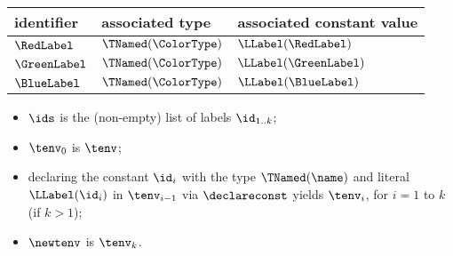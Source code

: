 \begin{center}
\begin{tabular}{lll}
\textbf{identifier} & \textbf{associated type} & \textbf{associated constant value}\\
\hline
$\RedLabel$ & $\TNamed(\ColorType)$ & $\LLabel(\RedLabel)$\\
$\GreenLabel$ & $\TNamed(\ColorType)$ & $\LLabel(\GreenLabel)$\\
$\BlueLabel$ & $\TNamed(\ColorType)$ & $\LLabel(\BlueLabel)$\\
\end{tabular}
\end{center}

\ProseParagraph
\AllApply
\begin{itemize}
  \item $\ids$ is the (non-empty) list of labels $\id_{1..k}$;
  \item $\tenv_0$ is $\tenv$;
  \item declaring the constant $\id_i$ with the type $\TNamed(\name)$ and literal $\LLabel(\id_i)$ in $\tenv_{i-1}$
        via $\declareconst$
        yields $\tenv_i$, for $i=1 $ to $k$ (if $k>1$)\ProseOrTypeError;
  \item $\newtenv$ is $\tenv_k$.
\end{itemize}

\FormallyParagraph
\begin{mathpar}
\end{mathpar}


